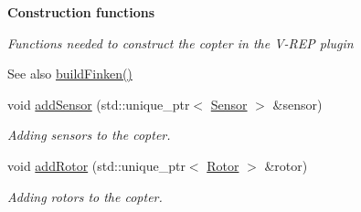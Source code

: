 \begin{Indent}{\bf Construction functions}\par
{\em Functions needed to construct the copter in the V-\/\+R\+EP plugin

\begin{DoxySeeAlso}{See also}
\hyperlink{finken_8cpp_ab8920c514423348469521fe0063534c4}{build\+Finken()} 
\end{DoxySeeAlso}
}\begin{DoxyCompactItemize}
\item 
void \hyperlink{classFinken_a2f2adb211e80a689f580b87730aeb9d1}{add\+Sensor} (std\+::unique\+\_\+ptr$<$ \hyperlink{classSensor}{Sensor} $>$ \&sensor)
\begin{DoxyCompactList}\small\item\em Adding sensors to the copter. \end{DoxyCompactList}\item 
void \hyperlink{classFinken_a4ac9d9b37fba41147a83a36286fbe91b}{add\+Rotor} (std\+::unique\+\_\+ptr$<$ \hyperlink{classRotor}{Rotor} $>$ \&rotor)
\begin{DoxyCompactList}\small\item\em Adding rotors to the copter. \end{DoxyCompactList}\end{DoxyCompactItemize}
\end{Indent}
